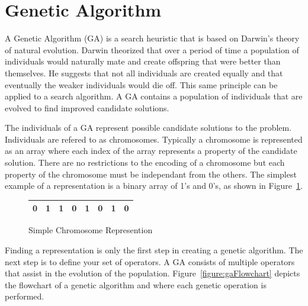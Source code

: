 \section{Genetic Algorithm}

A Genetic Algorithm (GA) is a search heuristic that is based on Darwin's theory of natural evolution. Darwin theorized that over a period of time a population of individuals would naturally mate and create offspring that were better than themselves. He suggests that not all individuals are created equally and that eventually the weaker individuals would die off. This same principle can be applied to a search algorithm. A GA contains a population of individuals that are evolved to find improved candidate solutions.

The individuals of a GA represent possible candidate solutions to the problem. Individuals are refered to as chromosomes. Typically a chromosome is represented as an array where each index of the array represents a property of the candidate solution. There are no restrictions to the encoding of a chromosome but each property of the chromosome must be independant from the others. The simplest example of a representation is a binary array of 1's and 0's, as shown in Figure~\ref{figure:sampleChromosome}.

\begin{figure}
  \label{figure:sampleChromosome}
  \centering
  \begin{tabular}{ | l | l | l | l | l | l | l | l | }
    \hline
    0 & 1 & 1 & 0 & 1 & 0 & 1 & 0 \\
    \hline
  \end{tabular}
  \caption{Simple Chromosome Represention}
\end{figure}

Finding a representation is only the first step in creating a genetic algorithm. The next step is to define your set of operators. A GA consists of multiple operators that assist in the evolution of the population. Figure~\ref{figure:gaFlowchart} depicts the flowchart of a genetic algorithm and where each genetic operation is performed.

